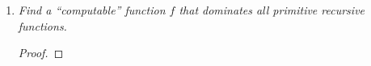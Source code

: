 \documentclass{article}
\begin{document}
\begin{enumerate}[label={\bf Q\arabic*:}]
    \begin{proof}
      We work backwards with the solution of the previous question to
      get the first three steps of the derivation. In our solution, we
      first derived addition function. Thus the first three steps are:
      \begin{enumerate}[label={\arabic*.}]
        \item $f_1(x) = x+1$
        \item $f_2(x) = x$
        \item $f_3(x_1,x_2,x_3) = x_2$
      \end{enumerate}
      The code of the third primitive recursive is therefore
      $p_1^{3+1}p_2^{2+1}=2^4\cdot3^3=1296$.
    \end{proof}

  \item \it Find a ``computable'' function $f$ that dominates all primitive
    recursive functions.

    \begin{proof}
    \end{proof}
\end{enumerate}
\end{document}
